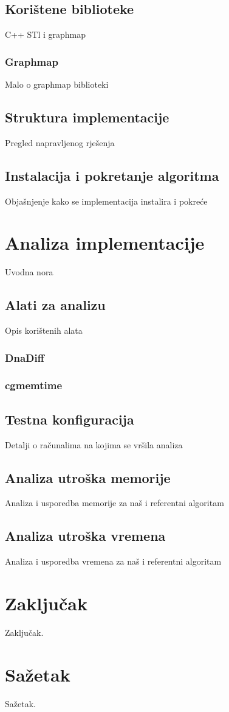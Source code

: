 \documentclass[times, utf8, seminar, numeric]{fer}
\begin{document}
\section{Korištene biblioteke}
C++ STl i graphmap
\subsection{Graphmap}
Malo o graphmap biblioteki
\section{Struktura implementacije}
Pregled napravljenog rješenja
\section{Instalacija i pokretanje algoritma}
Objašnjenje kako se implementacija instalira i pokreće

\chapter{Analiza implementacije}
Uvodna nora
\section{Alati za analizu}
Opis korištenih alata
\subsection{DnaDiff}
\subsection{cgmemtime}
\section{Testna konfiguracija}
Detalji o računalima na kojima se vršila analiza
\section{Analiza utroška memorije}
Analiza i usporedba memorije za naš i referentni algoritam
\section{Analiza utroška vremena}
Analiza i usporedba vremena za naš i referentni algoritam

\chapter{Zaključak}
Zaključak.




\chapter{Sažetak}
Sažetak.
\end{document}
